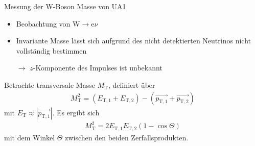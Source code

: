 \documentclass[aspectratio=1610, professionalfonts, 10pt]{beamer}
\begin{document}
\begin{frame}{Messung der W-Boson Masse von UA1}
				\begin{itemize}
					\setlength\itemsep{0.5em}
					\vspace*{-20px}
					\item Beobachtung von $\text{W} \rightarrow \text{e} \nu$
					\item Invariante Masse lässt sich aufgrund des nicht detektierten Neutrinos nicht vollständig bestimmen
					\item[$\rightarrow$] $z$-Komponente des Impulses ist unbekannt
				\end{itemize}
				Betrachte transversale Masse $M_\text{T}$, definiert über
				\begin{align*}
					M_\text{T}^2 = \left( E_{\text{T}, 1} + E_{\text{T}, 2} \right) - \left( \vec{p_{\text{T}, 1}} + \vec{p_{\text{T}, 2}} \right)
				\end{align*}
				mit $E_\text{T} \approx |\vec{p_{\text{T}, 1}}|$. Es ergibt sich
				\begin{align*}
					M_\text{T}^2 = 2 E_{\text{T}, 1} E_{\text{T}, 2} \left( 1 - \cos{\Theta} \right)
				\end{align*}
				mit dem Winkel $\Theta$ zwischen den beiden Zerfallsprodukten.
\end{frame}
\end{document}

